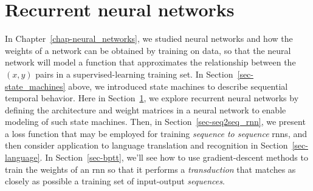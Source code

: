 \section{Recurrent neural networks}
\label{sec-rnn_model}

In Chapter~\ref{chap-neural_networks}, we studied neural networks and
how the weights of a network can be obtained by training on data, so
that the neural network will model a function that approximates the
relationship between the $(x, y)$ pairs in a supervised-learning
training set.  In Section~\ref{sec-state_machines} above, we
introduced state machines to describe sequential temporal
behavior. Here in Section~\ref{sec-rnn_model}, we explore recurrent
neural networks by defining the architecture and weight matrices in a
neural network to enable modeling of such state machines.  Then, in
Section~\ref{sec-seq2seq_rnn}, we present a loss function that may be
employed for training {\em sequence to sequence} {\sc rnn}s, and then
consider application to language translation and recognition in
Section~\ref{sec-language}.  In Section~\ref{sec-bptt}, we'll see how
to use gradient-descent methods to train the weights of an {\sc rnn}
so that it performs a {\em transduction} that matches as closely as
possible a training set of input-output {\em sequences}.

\bigskip

